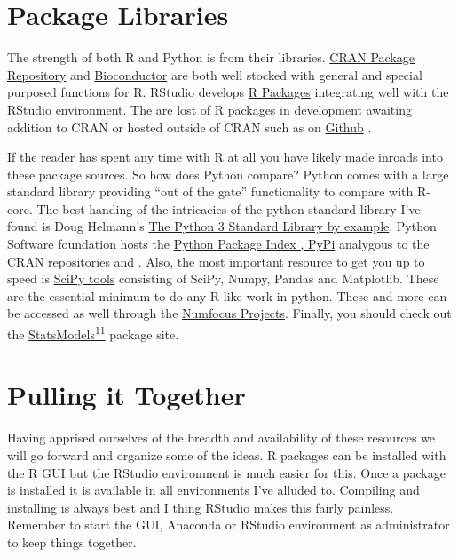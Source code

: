 \documentclass[]{book}
\theoremstyle{definition}
\theoremstyle{definition}
\theoremstyle{definition}
\theoremstyle{remark}
\begin{document}
\section{Package Libraries}\label{package-libraries}

The strength of both R and Python is from their libraries.
\href{https://cran.cnr.berkeley.edu/index.html}{CRAN Package Repository}
and \href{http://www.bioconductor.org/about/}{Bioconductor}
 are both well stocked with general and special
purposed functions for R. RStudio develops
\href{https://www.rstudio.com/products/rpackages/}{R Packages}
integrating well with the RStudio environment. The are lost of R
packages in development awaiting addition to CRAN or hosted outside of
CRAN such as on \href{https://github.com/search?q=R+language}{Github}
.

If the reader has spent any time with R at all you have likely made
inroads into these package sources. So how does Python compare? Python
comes with a large standard library providing ``out of the gate''
functionality to compare with R-core. The best handing of the
intricacies of the python standard library I've found is Doug Helmann's
\href{https://amazon.com/Python-Standard-Library-Example-Developers/dp/0134291050/}{The
Python 3 Standard Library by example}. Python Software foundation hosts
the \href{https://pypi.org/}{Python Package Index , PyPi} 
analygous to the CRAN repositories and . Also, the
most important resource to get you up to speed is
\href{https://www.scipy.org/}{SciPy tools} consisting of SciPy, Numpy,
Pandas and Matplotlib. These are the essential minimum to do any R-like
work in python. These and more can be accessed as well through the
\href{https://numfocus.org/sponsored-projects}{Numfocus Projects}.
 Finally, you should check out the
\href{https://www.statsmodels.org/stable/index.html}{StatsModels\textsuperscript{11}}
 package site.

\section{Pulling it Together}\label{pulling-it-together}

Having apprised ourselves of the breadth and availability of these
resources we will go forward and organize some of the ideas. R packages
can be installed with the R GUI but the RStudio environment is much
easier for this. Once a package is installed it is available in all
environments I've alluded to. Compiling and installing is always best
and I thing RStudio makes this fairly painless. Remember to start the
GUI, Anaconda or RStudio environment as administrator to keep things
together.
\end{document}
